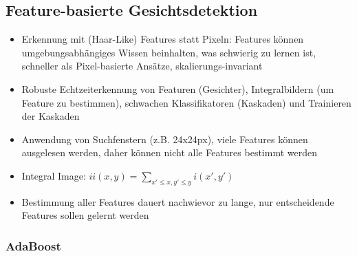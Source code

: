 \documentclass[paper=a4, fontsize=11pt]{scrartcl} %
\numberwithin{equation}{section} %
\numberwithin{figure}{section} %
\numberwithin{table}{section} %
\begin{document}
\subsection{Feature-basierte Gesichtsdetektion}

\begin{itemize}
\item Erkennung mit (Haar-Like) Features statt Pixeln: Features können umgebungsabhängiges Wissen beinhalten, was schwierig zu lernen ist, schneller als Pixel-basierte Ansätze, skalierungs-invariant
\item Robuste Echtzeiterkennung von Featuren (Gesichter), Integralbildern (um Feature zu bestimmen), schwachen Klassifikatoren (Kaskaden) und Trainieren der Kaskaden
\item Anwendung von Suchfenstern (z.B. 24x24px), viele Features können ausgelesen werden, daher können nicht alle Features bestimmt werden
\item Integral Image: $ii(x,y) = \sum\limits_{x' \le x, y' \le y} i(x',y')$
\item Bestimmung aller Features dauert nachwievor zu lange, nur entscheidende Features sollen gelernt werden
\end{itemize}

\subsubsection{AdaBoost}
\end{document}
